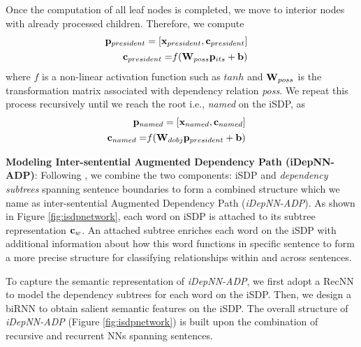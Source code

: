 \documentclass[letterpaper]{article} \usepackage{aaai19}  \usepackage{times}  \usepackage{helvet}  \usepackage{courier}  \usepackage{url}  \usepackage{graphicx}
\begin{document}
Once the computation of all leaf nodes is completed, we move to interior nodes with already processed children. Therefore, we compute \begin{align*}
\begin{split}
{\bf p}_{president} & =  [{\bf x}_{president}, {\bf c}_{president} ]
\end{split}\\
\begin{split}
{\bf c}_{president} =& f({\bf W}_{poss} {\bf p}_{its} + {\bf b})
\end{split}
\end{align*}
where $f$ is a non-linear activation function such as $tanh$ and ${\bf W}_{poss}$ is the transformation matrix associated with dependency relation \textit{poss}.
We repeat this process recursively until we reach the root i.e., {\it named} on the iSDP, as
\begin{align*}
\begin{split}
{\bf p}_{named} & = [{\bf x}_{named}, {\bf c}_{named}]
\end{split}\\
\begin{split}
{\bf c}_{named} = & f({\bf W}_{dobj} {\bf p}_{president} + {\bf b})
\end{split}
\end{align*}
\fi

{\bf Modeling Inter-sentential Augmented Dependency Path (iDepNN-ADP)}: 
Following \citeauthor{liu2015dependency} , we combine the two components: iSDP and {\it dependency subtrees} spanning sentence boundaries 
to form a combined structure which we name as  inter-sentential Augmented Dependency Path ({\it iDepNN-ADP}). 
As shown in Figure \ref{fig:isdpnetwork}, each word on iSDP is attached to its subtree representation ${\bf c}_w$.  
An attached subtree enriches each word on the iSDP with additional information about how this word functions in specific sentence to form a more precise structure 
for classifying relationships within and across sentences.

To capture the semantic representation of {\it iDepNN-ADP}, we first adopt a RecNN to model the dependency subtrees for each word on the iSDP. 
Then, we design a biRNN to obtain salient semantic features  on the iSDP. The overall structure of {\it iDepNN-ADP} (Figure \ref{fig:isdpnetwork}) is built upon the combination of recursive and recurrent NNs spanning sentences. 
\end{document}
